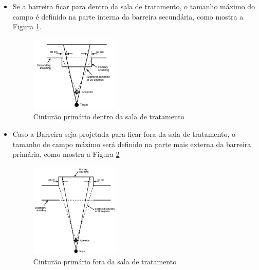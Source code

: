 \documentclass[11pt,a4paper]{article}
\begin{document}
            \begin{itemize}
                \item Se a barreira ficar para dentro da sala de tratamento, o tamanho máximo do campo é definido na parte interna da barreira secundária, como mostra a Figura \ref{fig:esquemaCinturaoPrimarioDentroDaSala}. 
                
                    \begin{figure}[h]
                        \centering
                        \includegraphics[width=0.4\textwidth]{Imagens/esquemaCinturaoPrimarioDentroDaSala.JPG}
                        \caption{Cinturão primário dentro da sala de tratamento}
                        \label{fig:esquemaCinturaoPrimarioDentroDaSala}
                    \end{figure}


                \item Caso a Barreira seja projetada para ficar fora da sala de tratamento, o tamanho de campo máximo será definido na parte mais externa da barreira primária, como mostra a Figura \ref{fig:esquemaCinturaoPrimarioForaDaSala}
                
                    \begin{figure}[h]
                        \centering
                        \includegraphics[width=0.4\textwidth]{Imagens/esquemaCinturaoPrimarioForaDaSala.JPG}
                        \caption{Cinturão primário fora da sala de tratamento}
                        \label{fig:esquemaCinturaoPrimarioForaDaSala}
                    \end{figure}


\end{itemize}
\end{document}
